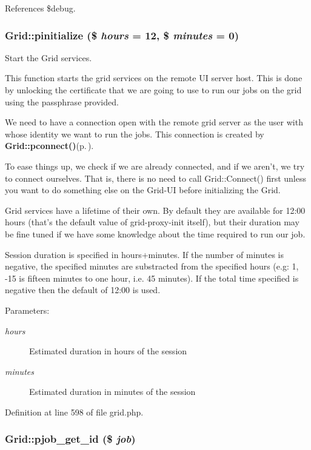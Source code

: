References \$debug.
\subsubsection{\setlength{\rightskip}{0pt plus 5cm}Grid::pinitialize (\$ {\em hours} = 12, \$ {\em minutes} = 0)}\label{classGrid_a11}


Start the Grid services. 

This function starts the grid services on the remote UI server host. This is done by unlocking the certificate that we are going to use to run our jobs on the grid using the passphrase provided.

We need to have a connection open with the remote grid server as the user with whose identity we want to run the jobs. This connection is created by {\bf Grid::pconnect()}{\rm (p.\,\pageref{classGrid_a9})}.

To ease things up, we check if we are already connected, and if we aren't, we try to connect ourselves. That is, there is no need to call Grid::Connect() first unless you want to do something else on the Grid-UI before initializing the Grid.

Grid services have a lifetime of their own. By default they are available for 12:00 hours (that's the default value of grid-proxy-init itself), but their duration may be fine tuned if we have some knowledge about the time required to run our job.

Session duration is specified in hours+minutes. If the number of minutes is negative, the specified minutes are substracted from the specified hours (e.g: 1, -15 is fifteen minutes to one hour, i.e. 45 minutes). If the total time specified is negative then the default of 12:00 is used.

\begin{Desc}
\item[Parameters:]
\begin{description}
\item[{\em hours}]Estimated duration in hours of the session\item[{\em minutes}]Estimated duration in minutes of the session \end{description}
\end{Desc}


Definition at line 598 of file grid.php.
\subsubsection{\setlength{\rightskip}{0pt plus 5cm}Grid::pjob\_\-get\_\-id (\$ {\em job})}\label{classGrid_a14}




